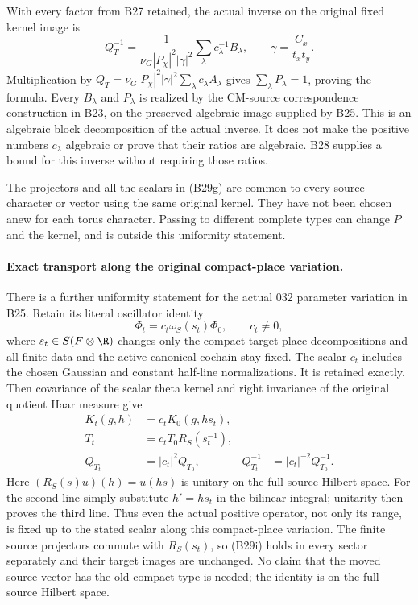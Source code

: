 \documentclass[11pt]{article}
\theoremstyle{definition}\newtheorem{definition}[theorem]{Definition}\newtheorem{remark}[theorem]{Remark}
\begin{document}
With every factor from B27 retained, the actual
inverse on the original fixed kernel image is
\[
 \boxed{\displaystyle
  Q_T^{-1}
    =\frac{1}{\nu_G|P_\chi|^2|\gamma|^2}
                 \sum_\lambda c_\lambda^{-1}B_\lambda,
          \qquad \gamma=\frac{C_x}{t_xt_y}.}
 \tag{B29g}
\]
Multiplication by
$Q_T=\nu_G|P_\chi|^2|\gamma|^2
\sum_\lambda c_\lambda A_\lambda$
gives $\sum_\lambda P_\lambda=1$, proving the formula.
Every $B_\lambda$ and $P_\lambda$ is realized by the
CM-source correspondence construction in B23, on
the preserved algebraic image supplied by B25.
This is an algebraic block decomposition of the
actual inverse.  It does not make the positive
numbers $c_\lambda$ algebraic or prove that their
ratios are algebraic.  B28 supplies a bound for
this inverse without requiring those ratios.

The projectors and all the scalars in (B29g) are
common to every source character or vector using
the same original kernel.  They have not been
chosen anew for each torus character.  Passing to
different complete types can change $P$ and the
kernel, and is outside this uniformity statement.

\paragraph{Exact transport along the original compact-place variation.}
There is a further uniformity statement for the
actual 032 parameter variation in B25.  Retain its
literal oscillator identity
\[
      \Phi_t=c_t\omega_S(s_t)\Phi_0,
                    \qquad c_t\ne0,
 \tag{B29h}
\]
where $s_t\in S(F\otimes\R)$ changes only the compact
target-place decompositions and all finite data and
the active canonical cochain stay fixed.  The scalar
$c_t$ includes the chosen Gaussian and constant
half-line normalizations.  It is retained exactly.
Then covariance of the scalar theta kernel and
right invariance of the original quotient Haar
measure give
\[
 \begin{aligned}
 K_t(g,h)&=c_tK_0(g,hs_t),\\
 T_t&=c_tT_0 R_S(s_t^{-1}),\\
 Q_{T_t}&=|c_t|^2Q_{T_0},
      &Q_{T_t}^{-1}&=|c_t|^{-2}Q_{T_0}^{-1}.
 \end{aligned}
 \tag{B29i}
\]
Here $(R_S(s)u)(h)=u(hs)$ is unitary on the full
source Hilbert space.  For the second line simply
substitute $h'=hs_t$ in the bilinear integral;
unitarity then proves the third line.  Thus even
the actual positive operator, not only its range,
is fixed up to the stated scalar along this
compact-place variation.  The finite source
projectors commute with $R_S(s_t)$, so (B29i)
holds in every sector separately and their target
images are unchanged.  No claim that the moved
source vector has the old compact type is needed;
the identity is on the full source Hilbert space.
\end{document}
